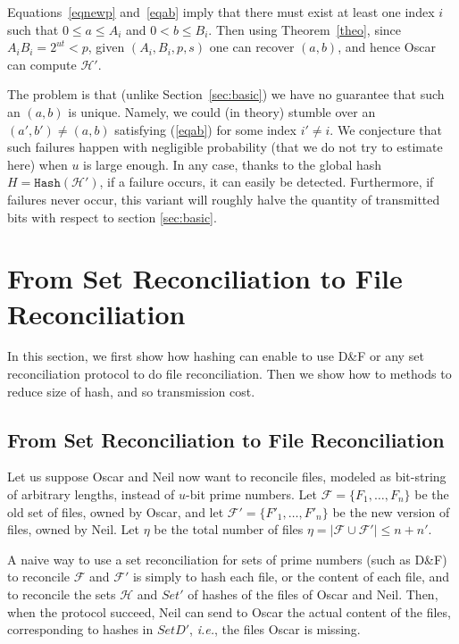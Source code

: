 \documentclass[11pt]{llncs}
\newcommand{\Set}{\mathcal{H}}
\newcommand{\Files}{\mathcal{F}}
\newcommand{\df}{D\&F\xspace}
\newcommand{\ie}{\textit{i.e.}\xspace}
\newcommand{\Hash}{\ensuremath{\mathtt{Hash}}}
\begin{document}
Equations~\eqref{eqnewp} and~\eqref{eqab} imply that there must exist at least one index $i$ such that $0 \leq a \leq A_i$ and $0 <b \leq B_i$. 
Then using Theorem~\ref{theo}, since $A_i B_i = 2^{ut} < p$, given $(A_i,B_i,p,s)$ one can recover $(a,b)$, and hence Oscar can compute $\Set'$.

The problem is that (unlike Section~\ref{sec:basic}) we have no guarantee that such an $(a,b)$ is unique. Namely, we could (in theory) stumble over an $(a',b')\neq (a,b)$ satisfying (\ref{eqab}) for some index $i' \neq i$. We conjecture that such failures happen with negligible probability (that we do not try to estimate here) when $u$ is large enough.
In any case, thanks to the global hash $H = \Hash(\Set')$, if a failure occurs, it can easily be detected.
Furthermore, if failures never occur, this variant will roughly halve the quantity of transmitted bits with respect to section \ref{sec:basic}.

\section{From Set Reconciliation to File Reconciliation}
\label{hashing}

In this section, we first show how hashing can enable to use \df or any set reconciliation protocol to do file reconciliation.
Then we show how to methods to reduce size of hash, and so transmission cost.

\subsection{From Set Reconciliation to File Reconciliation}

Let us suppose Oscar and Neil now want to reconcile files, modeled as bit-string of arbitrary lengths, instead of $u$-bit prime numbers.
Let $\Files = \{F_1,\dots,F_n\}$ be the old set of files, owned by Oscar, and let $\Files' = \{F'_1,\dots,F'_n\}$ be the new version of files, owned by Neil.
Let $\eta$ be the total number of files $\eta = | \Files \cup \Files'| \le n+n'$.

A naive way to use a set reconciliation for sets of prime numbers (such as \df) to reconcile $\Files$ and $\Files'$ is simply to hash each file, or the content of each file, and to reconcile the sets $\Set$ and $Set'$ of hashes of the files of Oscar and Neil.
Then, when the protocol succeed, Neil can send to Oscar the actual content of the files, corresponding to hashes in $SetD'$, \ie, the files Oscar is missing.
\end{document}
